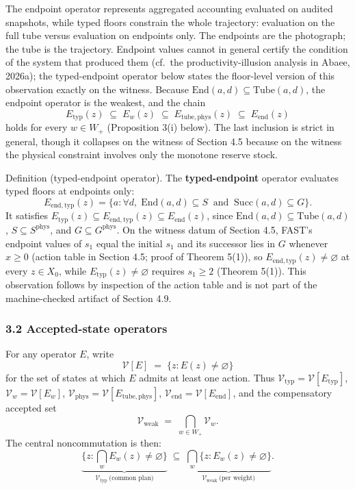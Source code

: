 \documentclass[11pt]{article}
\begin{document}
The endpoint operator represents aggregated accounting evaluated on audited snapshots, while typed floors constrain the whole trajectory: evaluation on the full tube versus evaluation on endpoints only. The endpoints are the photograph; the tube is the trajectory. Endpoint values cannot in general certify the condition of the system that produced them (cf.\ the productivity-illusion analysis in Abaee, 2026a); the typed-endpoint operator below states the floor-level version of this observation exactly on the witness. Because \(\mathrm{End}(a,d) \subseteq \mathrm{Tube}(a,d)\), the
endpoint operator is the weakest, and the chain
\[E_{\mathrm{typ}}(z) \;\subseteq\; E_w(z) \;\subseteq\; E_{\mathrm{tube,phys}}(z) \;\subseteq\; E_{\mathrm{end}}(z)\]
holds for every \(w \in W_+\) (Proposition 3(i) below). The last
inclusion is strict in general, though it collapses on the witness of
Section 4.5 because on the witness the physical constraint involves only the monotone reserve stock.

Definition (typed-endpoint operator). The \textbf{typed-endpoint} operator evaluates typed floors at endpoints only:
\[E_{\mathrm{end,typ}}(z) = \{ a : \forall d,\; \mathrm{End}(a,d) \subseteq S \ \text{ and } \ \mathrm{Succ}(a,d) \subseteq G \}.\]
It satisfies \(E_{\mathrm{typ}}(z) \subseteq E_{\mathrm{end,typ}}(z) \subseteq E_{\mathrm{end}}(z)\), since \(\mathrm{End}(a,d) \subseteq \mathrm{Tube}(a,d)\), \(S \subseteq S^{\mathrm{phys}}\), and \(G \subseteq G^{\mathrm{phys}}\). On the witness datum of Section 4.5, FAST's endpoint values of \(s_1\) equal the initial \(s_1\) and its successor lies in \(G\) whenever \(x \ge 0\) (action table in Section 4.5; proof of Theorem 5(1)), so \(E_{\mathrm{end,typ}}(z) \neq \varnothing\) at every \(z \in X_0\), while \(E_{\mathrm{typ}}(z) \neq \varnothing\) requires \(s_1 \ge 2\) (Theorem 5(1)). This observation follows by inspection of the action table and is not part of the machine-checked artifact of Section 4.9.

\subsubsection{3.2 Accepted-state
operators}\label{accepted-state-operators}

For any operator \(E\), write
\[\mathcal{V}[E] \;=\; \{ z : E(z) \neq \varnothing \}\] for the set of
states at which \(E\) admits at least one action. Thus
\(\mathcal{V}_{\mathrm{typ}} = \mathcal{V}[E_{\mathrm{typ}}]\),
\(\mathcal{V}_w = \mathcal{V}[E_w]\),
\(\mathcal{V}_{\mathrm{phys}} = \mathcal{V}[E_{\mathrm{tube,phys}}]\),
\(\mathcal{V}_{\mathrm{end}} = \mathcal{V}[E_{\mathrm{end}}]\), and the
compensatory accepted set
\[\mathcal{V}_{\mathrm{weak}} \;=\; \bigcap_{w \in W_+} \mathcal{V}_w .\]
The central noncommutation is then:
\[\underbrace{\{ z : \textstyle\bigcap_w E_w(z) \neq \varnothing \}}_{\mathcal{V}_{\mathrm{typ}} \ \text{(common plan)}} \;\subseteq\; \underbrace{\bigcap_w \{ z : E_w(z) \neq \varnothing \}}_{\mathcal{V}_{\mathrm{weak}} \ \text{(per weight)}}.\]
\end{document}
